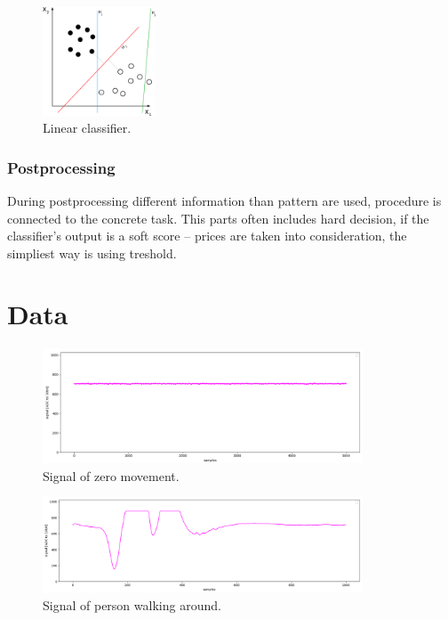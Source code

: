 \begin{figure}[h!]
\begin{center}
\includegraphics[width=0.3\textwidth]{obrazky-figures/linear.png}
\caption{Linear classifier.\cite{LinearClassifier}\label{fig:linearclassifier}}
\end{center}
\end{figure}

\subsection*{Postprocessing}
During postprocessing different information than pattern are used, procedure is
connected to the concrete task. This parts often includes hard decision, if the
classifier's output is a soft score -- prices are taken into consideration,
the simpliest way is using treshold.



\chapter{Data}

\begin{figure}[h!]
\begin{center}
\includegraphics[width=0.85\textwidth]{obrazky-figures/signal_calm.png}
\caption{Signal of zero movement.\label{fig:signalcalm}}
\end{center}
\end{figure}

\begin{figure}[h!]
\begin{center}
\includegraphics[width=0.85\textwidth]{obrazky-figures/signal_walk.png}
\caption{Signal of person walking around.\label{fig:signalwalk}}
\end{center}
\end{figure}

